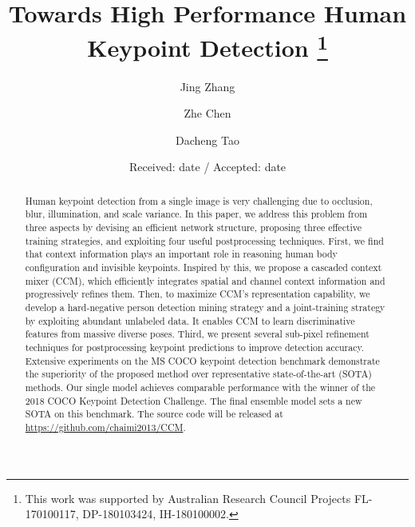 \documentclass[twocolumn]{svjour3}          \smartqed  \usepackage{natbib}
\begin{document}
\title{Towards High Performance Human Keypoint Detection
\thanks{This work was supported by Australian Research Council Projects FL-170100117, DP-180103424, IH-180100002.}
}




\author{Jing Zhang \and Zhe Chen \and Dacheng Tao }



\date{Received: date / Accepted: date}


\maketitle

\begin{abstract}
Human keypoint detection from a single image is very challenging due to occlusion, blur, illumination, and scale variance. In this paper, we address this problem from three aspects by devising an efficient network structure, proposing three effective training strategies, and exploiting four useful postprocessing techniques. First, we find that context information plays an important role in reasoning human body configuration and invisible keypoints. Inspired by this, we propose a cascaded context mixer (CCM), which efficiently integrates spatial and channel context information and progressively refines them. Then, to maximize CCM's representation capability, we develop a hard-negative person detection mining strategy and a joint-training strategy by exploiting abundant unlabeled data. It enables CCM to learn discriminative features from massive diverse poses. Third, we present several sub-pixel refinement techniques for postprocessing keypoint predictions to improve detection accuracy. Extensive experiments on the MS COCO keypoint detection benchmark demonstrate the superiority of the proposed method over representative state-of-the-art (SOTA) methods. Our single model achieves comparable performance with the winner of the 2018 COCO Keypoint Detection Challenge. The final ensemble model sets a new SOTA on this benchmark. The source code will be released at \url{https://github.com/chaimi2013/CCM}.


\end{abstract}
\end{document}
